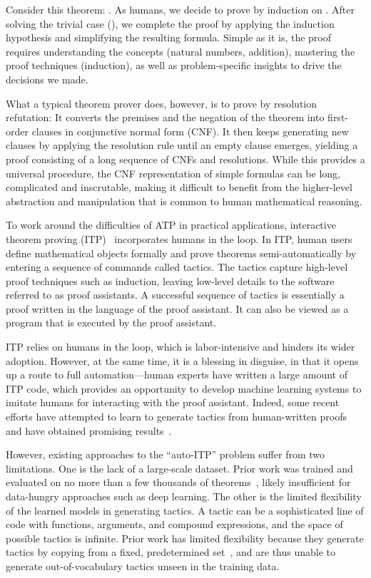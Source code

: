 \documentclass{article}
\begin{document}
Consider this theorem: . 
As humans, we decide to prove by induction on .
After solving the trivial case (), we complete the proof by applying the induction hypothesis and simplifying the resulting formula.
Simple as it is, the proof requires understanding the concepts (natural numbers, addition), mastering the proof techniques (induction), as well as problem-specific insights to drive the decisions we made.

What a typical theorem prover does, however, is to prove by resolution refutation:
It converts the premises and the negation of the theorem into first-order clauses in conjunctive normal form (CNF).
It then keeps generating new clauses by applying the resolution rule until an empty clause emerges,
yielding a proof consisting of a long sequence of CNFs and resolutions. While this provides a universal procedure, the CNF representation of simple formulas can be long, complicated and inscrutable, making it difficult to benefit from the higher-level abstraction and manipulation that is common to human mathematical reasoning. 

To work around the difficulties of ATP in practical applications, interactive theorem proving (ITP)~\citep{harrison2014history} incorporates humans in the loop.
In ITP, human users define mathematical objects formally and prove theorems semi-automatically by entering a sequence of commands called tactics.
The tactics capture high-level proof techniques such as induction, 
leaving low-level details to the software referred to as proof assistants. A successful sequence of tactics is essentially a proof written in the language of the proof assistant. It can also be viewed as a program that is executed by the proof assistant. 

ITP relies on humans in the loop, which is labor-intensive and hinders its wider adoption. However, at the same time, it is a blessing in disguise, in that it opens up a route to full automation---human experts have written a large amount of ITP code, which provides an opportunity to develop machine learning systems to imitate humans for interacting with the proof assistant. Indeed, some recent efforts have attempted to learn to generate tactics from human-written proofs and have obtained promising results~\cite{gransden2015sepia,gauthier2018learning,bansal2019holist}. 

However, existing approaches to the ``auto-ITP'' problem suffer from two limitations. One is the lack of a large-scale dataset. Prior work was trained and evaluated on no more than a few thousands of theorems~\cite{gransden2015sepia,gauthier2018learning,huang2018gamepad}, likely insufficient for data-hungry approaches such as deep learning. The other is the limited flexibility of the learned models in generating tactics. A tactic can be a sophisticated line of code with functions, arguments, and compound expressions, and the space of possible tactics is infinite. Prior work has limited flexibility because they generate tactics by copying from a fixed, predetermined set~\cite{gransden2015sepia,gauthier2018learning,huang2018gamepad,bansal2019holist}, and are thus unable to generate out-of-vocabulary tactics unseen in the training data. 
\end{document}
